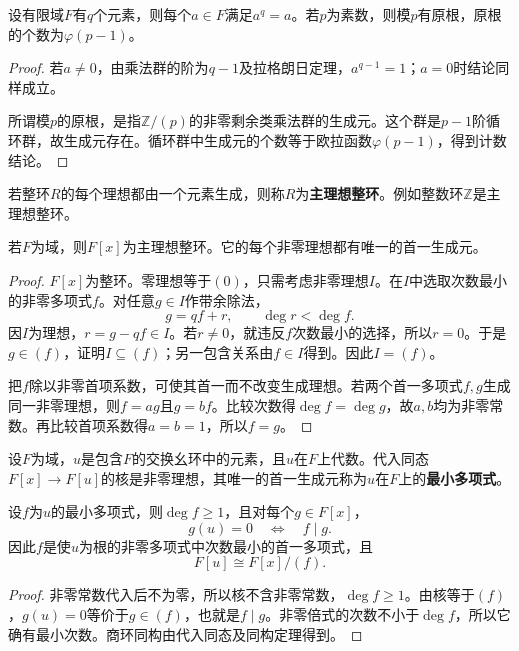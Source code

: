 \begin{corollary}
设有限域$F$有$q$个元素，则每个$a\in F$满足$a^q=a$。若$p$为素数，则模$p$有原根，原根的个数为$\varphi(p-1)$。
\end{corollary}
\begin{proof}
若$a\ne0$，由乘法群的阶为$q-1$及拉格朗日定理，$a^{q-1}=1$；$a=0$时结论同样成立。

所谓模$p$的原根，是指$\mathbb Z/(p)$的非零剩余类乘法群的生成元。这个群是$p-1$阶循环群，故生成元存在。循环群中生成元的个数等于欧拉函数$\varphi(p-1)$，得到计数结论。
\end{proof}

\begin{definition}
若整环$R$的每个理想都由一个元素生成，则称$R$为\textbf{主理想整环}。例如整数环$\mathbb Z$是主理想整环。
\end{definition}

\begin{theorem}\label{p2:field-poly-pid}
若$F$为域，则$F[x]$为主理想整环。它的每个非零理想都有唯一的首一生成元。
\end{theorem}
\begin{proof}
$F[x]$为整环。零理想等于$(0)$，只需考虑非零理想$I$。在$I$中选取次数最小的非零多项式$f$。对任意$g\in I$作带余除法，
\[
g=qf+r,\qquad\deg r<\deg f.
\]
因$I$为理想，$r=g-qf\in I$。若$r\ne0$，就违反$f$次数最小的选择，所以$r=0$。于是$g\in(f)$，证明$I\subseteq(f)$；另一包含关系由$f\in I$得到。因此$I=(f)$。

把$f$除以非零首项系数，可使其首一而不改变生成理想。若两个首一多项式$f,g$生成同一非零理想，则$f=ag$且$g=bf$。比较次数得$\deg f=\deg g$，故$a,b$均为非零常数。再比较首项系数得$a=b=1$，所以$f=g$。
\end{proof}

\begin{definition}
设$F$为域，$u$是包含$F$的交换幺环中的元素，且$u$在$F$上代数。代入同态$F[x]\to F[u]$的核是非零理想，其唯一的首一生成元称为$u$在$F$上的\textbf{最小多项式}。
\end{definition}

\begin{proposition}
设$f$为$u$的最小多项式，则$\deg f\ge1$，且对每个$g\in F[x]$，
\[
g(u)=0\quad\Longleftrightarrow\quad f\mid g.
\]
因此$f$是使$u$为根的非零多项式中次数最小的首一多项式，且
\[
F[u]\cong F[x]/(f).
\]
\end{proposition}
\begin{proof}
非零常数代入后不为零，所以核不含非零常数，$\deg f\ge1$。由核等于$(f)$，$g(u)=0$等价于$g\in(f)$，也就是$f\mid g$。非零倍式的次数不小于$\deg f$，所以它确有最小次数。商环同构由代入同态及同构定理得到。
\end{proof}

